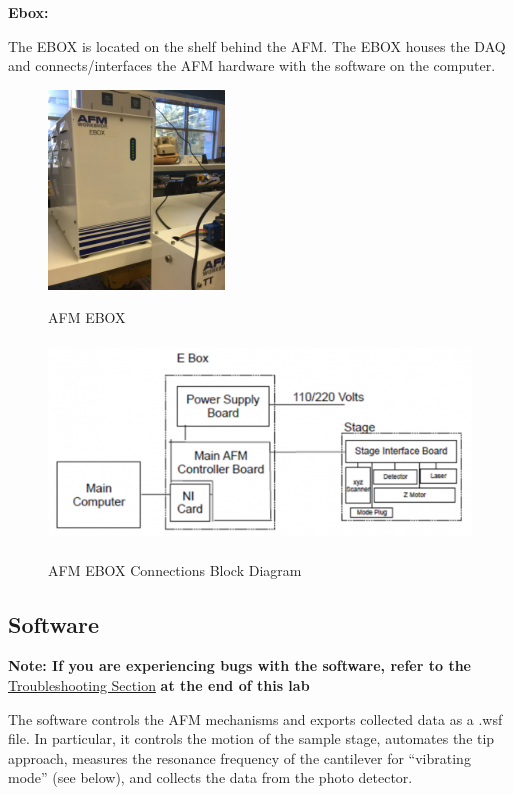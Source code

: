 \documentclass{../lab}
\begin{document}
\textbf{Ebox:}

The EBOX is located on the shelf behind the AFM. The EBOX houses the DAQ and connects/interfaces the AFM hardware with the software on the computer.

\begin{figure}[H]
\centering
  \href{http://experimentationlab.berkeley.edu/sites/default/files/EBOX.jpg}{\includegraphics[height=150pt,keepaspectratio]{images/EBOX.jpg}}
  \caption{AFM EBOX}
  \label{fig:EBox}
\endminipage\hfill
{}
\centering
  \href{http://experimentationlab.berkeley.edu/sites/default/files/AFMImages/AFMconnections.PNG}{\includegraphics[height=150pt,keepaspectratio]{images/AFMconnections.PNG}}
  \caption{AFM EBOX Connections Block Diagram}
    \label{fig:AFMConnections}
\endminipage
\end{figure}

\subsection{Software}

\textbf{Note: If you are experiencing bugs with the software, refer to the} \hyperref[sec:Troubleshooting]{Troubleshooting Section} \textbf{at the end of this lab}

The software controls the AFM mechanisms and exports collected data as a .wsf file. In particular, it controls the motion of the sample stage, automates the tip approach, measures the resonance frequency of the cantilever for ``vibrating mode'' (see below), and collects the data from the photo detector.
\end{document}
